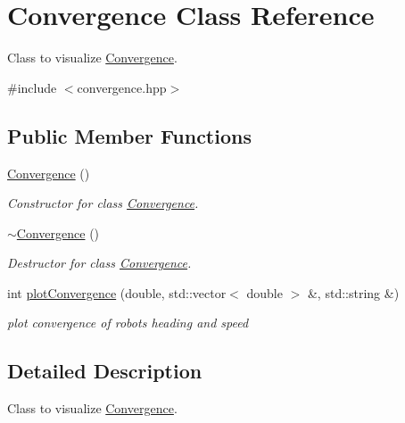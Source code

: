 \hypertarget{classConvergence}{}\section{Convergence Class Reference}
\label{classConvergence}


Class to visualize \hyperlink{classConvergence}{Convergence}.  




{\ttfamily \#include $<$convergence.\+hpp$>$}

\subsection*{Public Member Functions}
\begin{DoxyCompactItemize}
\item 
\mbox{\label{classConvergence_a644fb586d68b13c52f88379ad2122a8f}} 
\hyperlink{classConvergence_a644fb586d68b13c52f88379ad2122a8f}{Convergence} ()
\begin{DoxyCompactList}\small\item\em Constructor for class \hyperlink{classConvergence}{Convergence}. \end{DoxyCompactList}\item 
\mbox{\label{classConvergence_ab1b92e86a86f779f0b7ff9964f02030a}} 
\hyperlink{classConvergence_ab1b92e86a86f779f0b7ff9964f02030a}{$\sim$\+Convergence} ()
\begin{DoxyCompactList}\small\item\em Destructor for class \hyperlink{classConvergence}{Convergence}. \end{DoxyCompactList}\item 
int \hyperlink{classConvergence_a7683c2efed8e5526481d361cb28bb6cf}{plot\+Convergence} (double, std\+::vector$<$ double $>$ \&, std\+::string \&)
\begin{DoxyCompactList}\small\item\em plot convergence of robot\textquotesingle{}s heading and speed \end{DoxyCompactList}\end{DoxyCompactItemize}


\subsection{Detailed Description}
Class to visualize \hyperlink{classConvergence}{Convergence}. 


